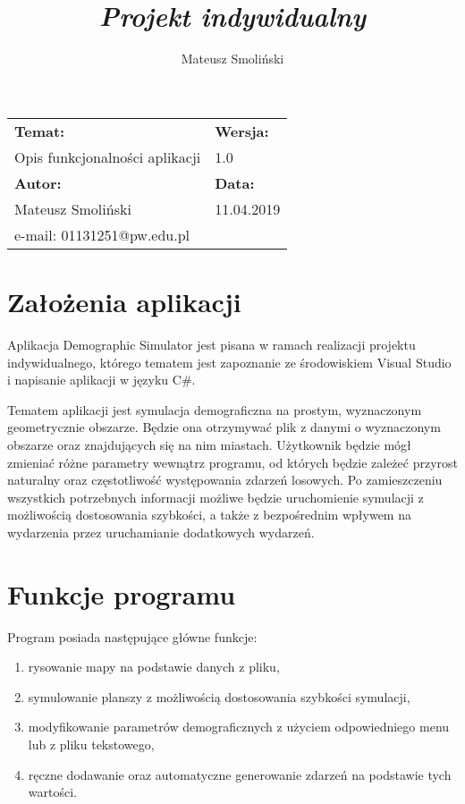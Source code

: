 \documentclass[a4paper,12pt]{article}
\title{ \sc{Specyfikacja funkcjonalna} \\
\emph{Projekt indywidualny} }
\author{Mateusz Smoliński}
\newcommand\tab[1][0.6cm]{\hspace*{#1} }
\begin{document}
\maketitle

\thispagestyle{empty}

\begin{tabu} to 0.9\textwidth{ |X[c]|X[c]| } 
 \hline
 \textbf{Temat:} & \textbf{Wersja:} \\ 
 Opis funkcjonalności aplikacji & 1.0 \\ 
 \hline
 \textbf{Autor:} & \textbf{Data:} \\ 
 Mateusz Smoliński & 11.04.2019 \\
 e-mail: 01131251@pw.edu.pl & \\
 \hline
\end{tabu}


\tableofcontents

\newpage

\section{Założenia aplikacji}

\tab Aplikacja Demographic Simulator jest pisana w ramach realizacji projektu indywidualnego, którego tematem jest zapoznanie ze środowiskiem Visual Studio i napisanie aplikacji w języku C\#. 

Tematem aplikacji jest symulacja demograficzna na prostym, wyznaczonym geometrycznie obszarze. Będzie ona otrzymywać plik z danymi o wyznaczonym obszarze oraz znajdujących się na nim miastach. Użytkownik będzie mógł zmieniać różne parametry wewnątrz programu, od których będzie zależeć przyrost naturalny oraz częstotliwość występowania zdarzeń losowych. Po zamieszczeniu wszystkich potrzebnych informacji możliwe będzie uruchomienie symulacji z możliwością dostosowania szybkości, a także z bezpośrednim wpływem na wydarzenia przez uruchamianie dodatkowych wydarzeń.


\section{Funkcje programu}

\tab Program posiada następujące główne funkcje:
\begin{enumerate}
\item rysowanie mapy na podstawie danych z pliku,
\item symulowanie planszy z możliwością dostosowania szybkości symulacji,
\item modyfikowanie parametrów demograficznych z użyciem odpowiedniego menu lub z pliku tekstowego,
\item ręczne dodawanie oraz automatyczne generowanie zdarzeń na podstawie tych wartości.
\end{enumerate}
\end{document}

